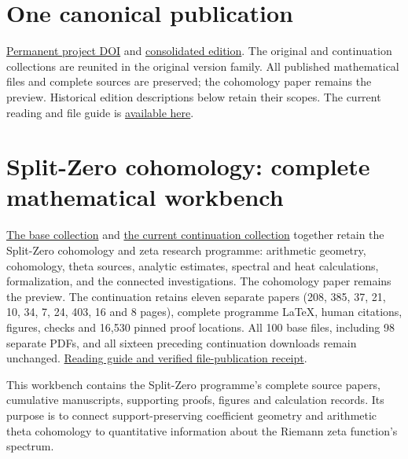\documentclass[
]{article}
\author{}
\date{}
\begin{document}
\section*{One canonical publication}
\href{https://doi.org/10.5281/zenodo.22678085}{Permanent project DOI} and \href{https://zenodo.org/records/22950644}{consolidated edition}. The original and continuation collections are reunited in the original version family. All published mathematical files and complete sources are preserved; the cohomology paper remains the preview. Historical edition descriptions below retain their scopes. The current reading and file guide is \href{https://github.com/KokunoYumeto/zeta-function-research-reader/blob/main/workbenches/splitzero-tandem/publication-consolidation/README.md}{available here}.


\section{Split-Zero cohomology: complete mathematical
workbench}\label{split-zero-cohomology-complete-mathematical-workbench}

\href{https://zenodo.org/records/22911829}{The base collection} and
\href{https://zenodo.org/records/22950644}{the current continuation
collection} together retain the Split-Zero cohomology and zeta research
programme: arithmetic geometry, cohomology, theta sources, analytic
estimates, spectral and heat calculations, formalization, and the
connected investigations. The cohomology paper remains the preview. The
continuation retains eleven separate papers (208, 385, 37, 21, 10, 34,
7, 24, 403, 16 and 8 pages), complete programme LaTeX, human citations,
figures, checks and 16,530 pinned proof locations. All 100 base files,
including 98 separate PDFs, and all sixteen preceding continuation
downloads remain unchanged.
\href{https://github.com/KokunoYumeto/zeta-function-research-reader/blob/main/workbenches/splitzero-tandem/continuations/20260923-retained-source-publication/README.md}{Reading
guide and verified file-publication receipt}.

This workbench contains the Split-Zero programme's complete source
papers, cumulative manuscripts, supporting proofs, figures and
calculation records. Its purpose is to connect support-preserving
coefficient geometry and arithmetic theta cohomology to quantitative
information about the Riemann zeta function's spectrum.
\end{document}
